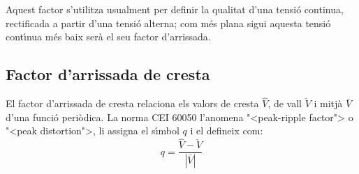 Aquest factor s'utilitza usualment per definir la qualitat d'una
tensi\'{o} continua, rectificada a partir d'una tensi\'{o} alterna; com m\'{e}s
plana sigui aquesta tensi\'{o} cont\'{\i}nua m\'{e}s baix ser\`{a} el seu factor
d'arrissada.

\subsection{Factor d'arrissada de cresta}

El factor d'arrissada de cresta relaciona els valors de cresta $\hat{V}$, de vall $\check{V}$  i mitj\`{a} $\bar{V}$
 d'una funci\'{o} peri\`{o}dica. La norma \textsf{CEI 60050} l'anomena {"<}peak-ripple factor{">} o {"<}peak distortion{">}, li assigna el s\'{\i}mbol $q$ i el defineix com:
\begin{equation}
    q = \frac{\hat{V} - \check{V}}{|\bar{V}|}
\end{equation}

